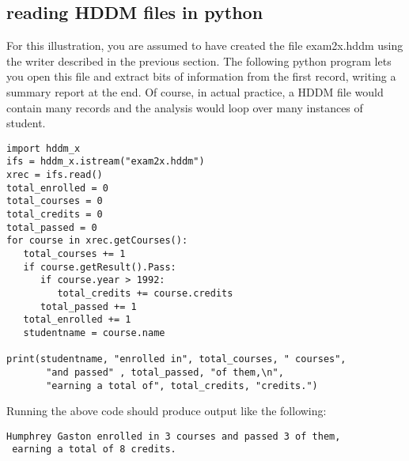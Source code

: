 \documentclass{revtex4}
\begin{document}
\subsection{reading HDDM files in python}

For this illustration, you are assumed to have created the file exam2x.hddm using
the writer described in the previous section. The following python program
lets you open this file and extract bits of information from the first record,
writing a summary report at the end. Of course, in actual practice, a HDDM
file would contain many records and the analysis would loop over many instances
of student.

\vspace{0.5cm}
\begin{minipage}{12cm}
\begin{verbatim}
import hddm_x
ifs = hddm_x.istream("exam2x.hddm")
xrec = ifs.read()
total_enrolled = 0
total_courses = 0
total_credits = 0
total_passed = 0
for course in xrec.getCourses():
   total_courses += 1
   if course.getResult().Pass:
      if course.year > 1992:
         total_credits += course.credits
      total_passed += 1
   total_enrolled += 1
   studentname = course.name

print(studentname, "enrolled in", total_courses, " courses",
       "and passed" , total_passed, "of them,\n",
       "earning a total of", total_credits, "credits.")
\end{verbatim}
\end{minipage}
\vspace{0.5cm}

Running the above code should produce output like the following:

\vspace{0.5cm}
\begin{minipage}{12cm}
\begin{verbatim}
Humphrey Gaston enrolled in 3 courses and passed 3 of them,
 earning a total of 8 credits.
\end{verbatim}
\end{minipage}
\vspace{0.5cm}
\end{document}
